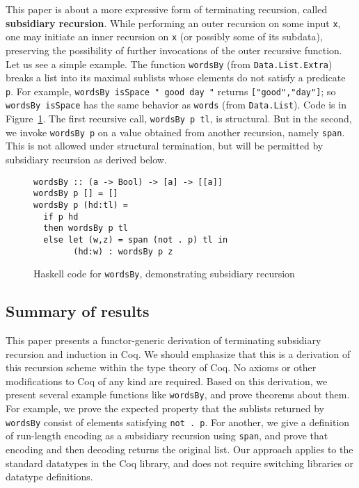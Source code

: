 \documentclass[a4paper,USenglish]{lipics-v2021}
\begin{document}
This paper is about a more expressive form of terminating recursion,
called \textbf{subsidiary recursion}.  While performing an outer
recursion on some input \verb|x|, one may initiate an inner recursion
on \verb|x| (or possibly some of its subdata), preserving the
possibility of further invocations of the outer recursive function.
Let us see a simple example.  The function \verb|wordsBy| (from
\verb|Data.List.Extra|) breaks a list into its maximal sublists whose
elements do not satisfy a predicate \verb|p|.  For example,
\verb|wordsBy isSpace " good day "| returns \verb|["good","day"]|; so
\verb|wordsBy isSpace| has the same behavior as \verb|words| (from
\verb|Data.List|).  Code is in Figure~\ref{fig:wordsBy}.  The first
recursive call, \verb|wordsBy p tl|, is structural.  But in the
second, we invoke \verb|wordsBy p| on a value obtained from another
recursion, namely \verb|span|.  This is not allowed under structural
termination, but will be permitted by subsidiary recursion as derived
below.

\begin{figure}
\begin{verbatim}
wordsBy :: (a -> Bool) -> [a] -> [[a]]
wordsBy p [] = []
wordsBy p (hd:tl) =
  if p hd
  then wordsBy p tl 
  else let (w,z) = span (not . p) tl in
        (hd:w) : wordsBy p z
\end{verbatim}
\caption{Haskell code for \texttt{wordsBy}, demonstrating subsidiary recursion}
\label{fig:wordsBy}
\end{figure}

\subsection{Summary of results}

This paper presents a functor-generic derivation of terminating
subsidiary recursion and induction in Coq.  We should emphasize that
this is a derivation of this recursion scheme within the type theory
of Coq.  No axioms or other modifications to Coq of any kind are
required. Based on this derivation, we present several example
functions like \verb|wordsBy|, and prove theorems about them.  For
example, we prove the expected property that the sublists returned by
\verb|wordsBy| consist of elements satisfying \verb|not . p|.
For another, we give a definition of run-length encoding as a
subsidiary recursion using \verb|span|, and prove that encoding and
then decoding returns the original list.  Our approach applies to the
standard datatypes in the Coq library, and does not require switching
libraries or datatype definitions.
\end{document}
